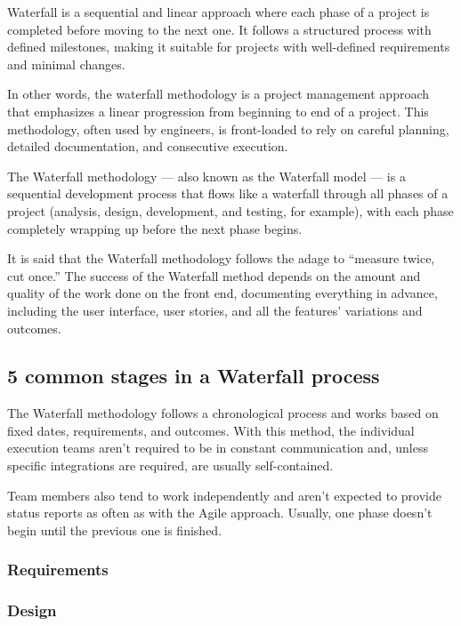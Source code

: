 Waterfall is a sequential and linear approach where each phase of a project is completed before moving to the next one. It follows a structured process with defined milestones, making it suitable for projects with well-defined requirements and minimal changes.

In other words, the waterfall methodology is a project management approach that emphasizes a linear progression from beginning to end of a project. This methodology, often used by engineers, is front-loaded to rely on careful planning, detailed documentation, and consecutive execution.

The Waterfall methodology — also known as the Waterfall model — is a sequential development process that flows like a waterfall through all phases of a project (analysis, design, development, and testing, for example), with each phase completely wrapping up before the next phase begins.

It is said that the Waterfall methodology follows the adage to “measure twice, cut once.” The success of the Waterfall method depends on the amount and quality of the work done on the front end, documenting everything in advance, including the user interface, user stories, and all the features’ variations and outcomes.

\subsection{5 common stages in a Waterfall process}

The Waterfall methodology follows a chronological process and works based on fixed dates, requirements, and outcomes. With this method, the individual execution teams aren’t required to be in constant communication and, unless specific integrations are required, are usually self-contained.

Team members also tend to work independently and aren’t expected to provide status reports as often as with the Agile approach. Usually, one phase doesn’t begin until the previous one is finished.


\subsubsection{Requirements}
\subsubsection{Design}
